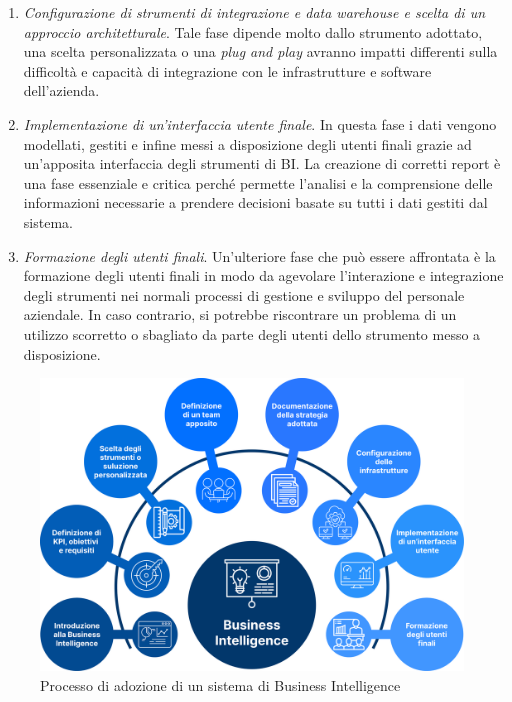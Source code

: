 \begin{enumerate}
    \item \textit{Configurazione di strumenti di integrazione e data warehouse e scelta di un approccio architetturale}. Tale fase dipende molto dallo strumento adottato, una scelta personalizzata o una \textit{plug and play} avranno impatti differenti sulla difficoltà e capacità di integrazione con le infrastrutture e software dell'azienda.
    \item \textit{Implementazione di un'interfaccia utente finale}. In questa fase i dati vengono modellati, gestiti e infine messi a disposizione degli utenti finali grazie ad un'apposita interfaccia degli strumenti di BI. La creazione di corretti report è una fase essenziale e critica perché permette l'analisi e la comprensione delle informazioni necessarie a prendere decisioni basate su tutti i dati gestiti dal sistema.
    \item \textit{Formazione degli utenti finali}. Un'ulteriore fase che può essere affrontata è la formazione degli utenti finali in modo da agevolare l'interazione e integrazione degli strumenti nei normali processi di gestione e sviluppo del personale aziendale. In caso contrario, si potrebbe riscontrare un problema di un utilizzo scorretto o sbagliato da parte degli utenti dello strumento messo a disposizione.
\end{enumerate}

\begin{figure} [H]
    \centering
    \includegraphics[width=1\linewidth]{figure//capitolo_3/Business Intelligence Process.pdf}
    \caption{Processo di adozione di un sistema di Business Intelligence}
    \label{fig:enter-labelBusiness Intelligence Process}
\end{figure}

